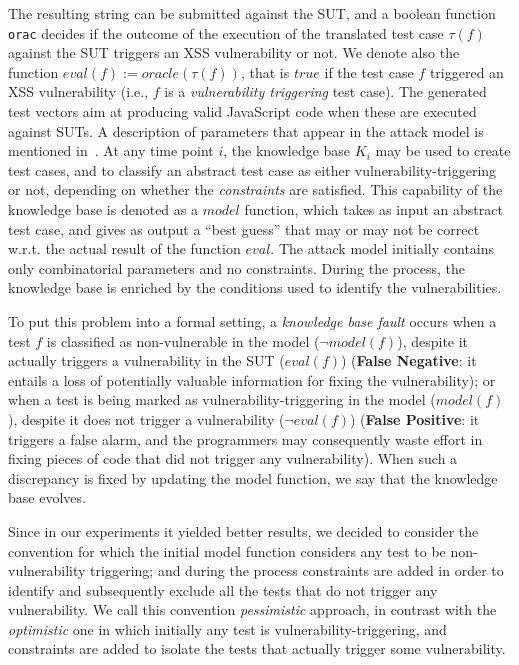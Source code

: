 \begin{tikzborder}{\cite{Gargantini16:validation}}
\begin{tikzborder}{\cite{gargantini_combinatorial_2017}}
\begin{tikzborder}{\cite{garn2019}}
\bb 
The resulting string can be submitted against the SUT, and a boolean function \texttt{orac} decides if the outcome of the execution of the
translated test case $\tau(f)$ against the SUT triggers an XSS vulnerability or not.
We denote also the function $eval(f):= oracle(\tau(f))$, that is $true$ if the test case $f$ triggered an XSS vulnerability (i.e., $f$ is a \emph{vulnerability triggering} test case).
The generated test vectors aim at producing valid JavaScript code when these are executed against SUTs.
A description of parameters that appear in the attack model is mentioned  in~\cite{bozic2015attack,garn2014applicability,wotawa_combinatorial_2016}. 
At any time point $i$, the knowledge base $K_{i}$ may be used to create test cases, and to classify an abstract test case as either vulnerability-triggering or not, depending on whether the \textit{constraints} are satisfied. %
This capability of the knowledge base is denoted as a $model$ function, which takes as input an abstract test case, and gives as output a ``best guess'' that may or may not be correct w.r.t. the actual result of the function $eval$. 
The attack model initially contains only combinatorial parameters and no constraints. During the process, the knowledge base is enriched by the conditions used to identify the vulnerabilities.

To put this problem into a formal setting, a \textit{knowledge base fault} occurs when a test $f$ is classified as non-vulnerable in the model ($\neg model(f)$), despite it actually triggers a vulnerability in the SUT ($eval(f)$) (\textbf{False Negative}: it entails a loss of potentially valuable information for fixing the vulnerability); or when a test is being marked as vulnerability-triggering in the model ($model(f)$), despite it does not trigger a vulnerability ($\neg eval(f)$) (\textbf{False Positive}: it triggers a false alarm, and the programmers may consequently waste effort in fixing pieces of code that did not trigger any vulnerability). %
When such a discrepancy is fixed by updating the model function, we say that the knowledge base evolves.

Since in our experiments it yielded better results, we decided to consider the convention for which the initial model function considers any test to be non-vulnerability triggering; and during the process constraints are added in order to identify and subsequently exclude all the tests that do not trigger any vulnerability. 
We call this convention \emph{pessimistic} approach, in contrast with the \emph{optimistic} one in which initially any test is vulnerability-triggering, and constraints are added to isolate the tests that actually trigger some vulnerability.


\end{tikzborder}
\end{tikzborder}
\end{tikzborder}
